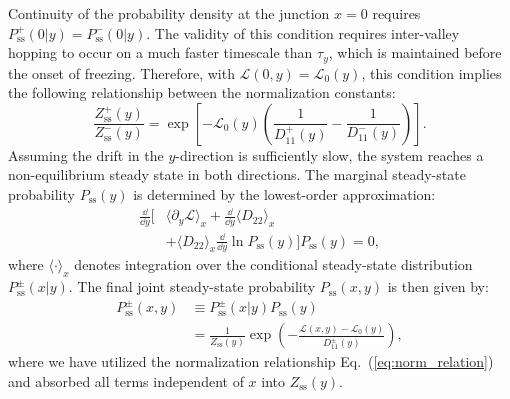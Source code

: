\documentclass[aps,prx,reprint,superscriptaddress,longbibliography,nofootinbib,floatfix]{revtex4-2}
\begin{document}
Continuity of the probability density at the junction $x=0$ requires $P_{\mathrm{ss}}^+(0|y) = P_{\mathrm{ss}}^-(0|y)$. The validity of this condition requires inter-valley hopping to occur on a much faster timescale than $\tau_y$, which is maintained before the onset of freezing. Therefore, with $\mathcal{L}(0, y) = \mathcal{L}_0(y)$, this condition implies the following relationship between the normalization constants:
\begin{equation} \label{eq:norm_relation}
\frac{Z_{\mathrm{ss}}^{+}(y)}{Z_{\mathrm{ss}}^{-}(y)}
= \exp\left[
-\mathcal{L}_{0}(y)\left( \frac{1}{D_{11}^{+}(y)} - \frac{1}{D_{11}^{-}(y)} \right)
\right].
\end{equation}
Assuming the drift in the $y$-direction is sufficiently slow, the system reaches a non-equilibrium steady state in both directions. The marginal steady-state probability $P_{\mathrm{ss}}(y)$ is determined by the lowest-order approximation:
\begin{equation}
\begin{split}
    \frac{\dd}{\dd y}\bigg[&\langle \partial_y \mathcal{L} \rangle_x+\frac{\dd}{\dd y} \langle D_{22} \rangle_x \\
    &+\langle D_{22}\rangle_x \frac{\dd}{\dd y} \ln P_{\mathrm{ss}}(y)\bigg] P_{\mathrm{ss}}(y)=0,
\end{split}
\end{equation}
where $\langle \cdot \rangle_x$ denotes integration over the conditional steady-state distribution $P_{\mathrm{ss}}^{\pm}(x|y)$. The final joint steady-state probability $P_{\mathrm{ss}}(x,y)$ is then given by:
\begin{equation}
\begin{split}
    P_{\mathrm{ss}}^{\pm}(x,y)&\equiv P_{\mathrm{ss}}^{\pm}(x|y)P_{\mathrm{ss}}(y) \\
    &=\frac{1}{Z_{\mathrm{ss}}(y)} \exp \left( - \frac{\mathcal{L}(x,y)-\mathcal{L}_{0}(y)}{D_{11}^{\pm}(y)} \right),
\end{split}
\end{equation}
where we have utilized the normalization relationship Eq.~(\ref{eq:norm_relation}) and absorbed all terms independent of $x$ into $Z_{\mathrm{ss}}(y)$.
\end{document}
